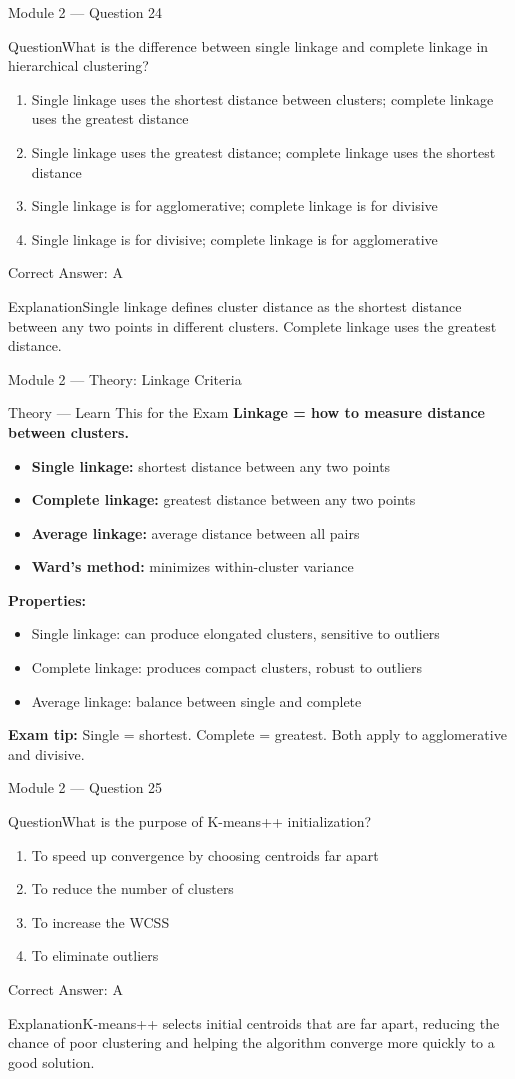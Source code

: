 \documentclass[aspectratio=169,10pt]{beamer}
\newcommand{\question}[1]{\begin{block}{Question}#1\end{block}}
\newcommand{\options}[4]{%
	\begin{enumerate}[label=\Alph*.,leftmargin=*]
		\item #1
		\item #2
		\item #3
		\item #4
	\end{enumerate}
}
\newcommand{\answerbox}[1]{\begin{exampleblock}{Correct Answer: #1}\end{exampleblock}}
\newcommand{\explain}[1]{\begin{block}{Explanation}#1\end{block}}
\newcommand{\theory}[1]{%
	\begin{block}{Theory --- Learn This for the Exam}
		\small #1
	\end{block}
}
\begin{document}
	\begin{frame}{Module 2 --- Question 24}
		\question{What is the difference between single linkage and complete linkage in hierarchical clustering?}
		\options{Single linkage uses the shortest distance between clusters; complete linkage uses the greatest distance}{Single linkage uses the greatest distance; complete linkage uses the shortest distance}{Single linkage is for agglomerative; complete linkage is for divisive}{Single linkage is for divisive; complete linkage is for agglomerative}
		\answerbox{A}
		\explain{Single linkage defines cluster distance as the shortest distance between any two points in different clusters. Complete linkage uses the greatest distance.}
	\end{frame}
	
	\begin{frame}{Module 2 --- Theory: Linkage Criteria}
		\theory{
			\textbf{Linkage = how to measure distance between clusters.}
			\begin{itemize}
				\item \textbf{Single linkage:} shortest distance between any two points
				\item \textbf{Complete linkage:} greatest distance between any two points
				\item \textbf{Average linkage:} average distance between all pairs
				\item \textbf{Ward's method:} minimizes within-cluster variance
			\end{itemize}
			\textbf{Properties:}
			\begin{itemize}
				\item Single linkage: can produce elongated clusters, sensitive to outliers
				\item Complete linkage: produces compact clusters, robust to outliers
				\item Average linkage: balance between single and complete
			\end{itemize}
			\textbf{Exam tip:} Single = shortest. Complete = greatest. Both apply to agglomerative and divisive.
		}
	\end{frame}
	
	\begin{frame}{Module 2 --- Question 25}
		\question{What is the purpose of K-means++ initialization?}
		\options{To speed up convergence by choosing centroids far apart}{To reduce the number of clusters}{To increase the WCSS}{To eliminate outliers}
		\answerbox{A}
		\explain{K-means++ selects initial centroids that are far apart, reducing the chance of poor clustering and helping the algorithm converge more quickly to a good solution.}
	\end{frame}
	
\end{document}
